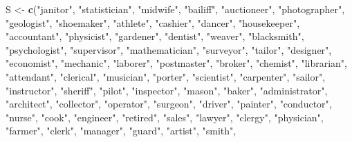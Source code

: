 \documentclass[english,man,mask]{apa6}
\newenvironment{Shaded}{\begin{snugshade}}{\end{snugshade}}
\newcommand{\KeywordTok}[1]{\textcolor[rgb]{0.13,0.29,0.53}{\textbf{#1}}}
\newcommand{\NormalTok}[1]{#1}
\newcommand{\StringTok}[1]{\textcolor[rgb]{0.31,0.60,0.02}{#1}}
\begin{document}
\begin{Shaded}
\begin{Highlighting}[]
\NormalTok{S <-}\StringTok{ }\KeywordTok{c}\NormalTok{(}\StringTok{"janitor"}\NormalTok{, }\StringTok{"statistician"}\NormalTok{, }\StringTok{"midwife"}\NormalTok{, }\StringTok{"bailiff"}\NormalTok{, }\StringTok{"auctioneer"}\NormalTok{,}
       \StringTok{"photographer"}\NormalTok{, }\StringTok{"geologist"}\NormalTok{, }\StringTok{"shoemaker"}\NormalTok{, }\StringTok{"athlete"}\NormalTok{, }\StringTok{"cashier"}\NormalTok{,}
       \StringTok{"dancer"}\NormalTok{, }\StringTok{"housekeeper"}\NormalTok{, }\StringTok{"accountant"}\NormalTok{, }\StringTok{"physicist"}\NormalTok{, }\StringTok{"gardener"}\NormalTok{,}
       \StringTok{"dentist"}\NormalTok{, }\StringTok{"weaver"}\NormalTok{, }\StringTok{"blacksmith"}\NormalTok{, }\StringTok{"psychologist"}\NormalTok{, }\StringTok{"supervisor"}\NormalTok{,}
       \StringTok{"mathematician"}\NormalTok{, }\StringTok{"surveyor"}\NormalTok{, }\StringTok{"tailor"}\NormalTok{, }\StringTok{"designer"}\NormalTok{, }\StringTok{"economist"}\NormalTok{,}
       \StringTok{"mechanic"}\NormalTok{, }\StringTok{"laborer"}\NormalTok{, }\StringTok{"postmaster"}\NormalTok{, }\StringTok{"broker"}\NormalTok{, }\StringTok{"chemist"}\NormalTok{, }\StringTok{"librarian"}\NormalTok{,}
       \StringTok{"attendant"}\NormalTok{, }\StringTok{"clerical"}\NormalTok{, }\StringTok{"musician"}\NormalTok{, }\StringTok{"porter"}\NormalTok{, }\StringTok{"scientist"}\NormalTok{,}
       \StringTok{"carpenter"}\NormalTok{, }\StringTok{"sailor"}\NormalTok{, }\StringTok{"instructor"}\NormalTok{, }\StringTok{"sheriff"}\NormalTok{, }\StringTok{"pilot"}\NormalTok{, }\StringTok{"inspector"}\NormalTok{,}
       \StringTok{"mason"}\NormalTok{, }\StringTok{"baker"}\NormalTok{, }\StringTok{"administrator"}\NormalTok{, }\StringTok{"architect"}\NormalTok{, }\StringTok{"collector"}\NormalTok{,}
       \StringTok{"operator"}\NormalTok{, }\StringTok{"surgeon"}\NormalTok{, }\StringTok{"driver"}\NormalTok{, }\StringTok{"painter"}\NormalTok{, }\StringTok{"conductor"}\NormalTok{, }\StringTok{"nurse"}\NormalTok{,}
       \StringTok{"cook"}\NormalTok{, }\StringTok{"engineer"}\NormalTok{, }\StringTok{"retired"}\NormalTok{, }\StringTok{"sales"}\NormalTok{, }\StringTok{"lawyer"}\NormalTok{, }\StringTok{"clergy"}\NormalTok{,}
       \StringTok{"physician"}\NormalTok{, }\StringTok{"farmer"}\NormalTok{, }\StringTok{"clerk"}\NormalTok{, }\StringTok{"manager"}\NormalTok{, }\StringTok{"guard"}\NormalTok{, }\StringTok{"artist"}\NormalTok{, }\StringTok{"smith"}\NormalTok{,}

\end{Highlighting}
\end{Shaded}
\end{document}
